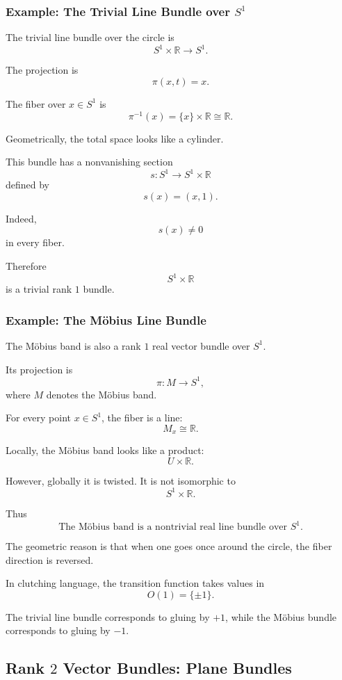 \documentclass[12pt,a4paper]{article}
\theoremstyle{notespace}
\begin{document}
\subsubsection{Example: The Trivial Line Bundle over \(S^1\)}

The trivial line bundle over the circle is
\[
S^1\times \mathbb R\longrightarrow S^1.
\]

The projection is
\[
\pi(x,t)=x.
\]

The fiber over \(x\in S^1\) is
\[
\pi^{-1}(x)=\{x\}\times \mathbb R\cong \mathbb R.
\]

Geometrically, the total space looks like a cylinder.

This bundle has a nonvanishing section
\[
s:S^1\to S^1\times \mathbb R
\]
defined by
\[
s(x)=(x,1).
\]

Indeed,
\[
s(x)\neq 0
\]
in every fiber.

Therefore
\[
S^1\times \mathbb R
\]
is a trivial rank \(1\) bundle.

\subsubsection{Example: The Möbius Line Bundle}

The Möbius band is also a rank \(1\) real vector bundle over \(S^1\).

Its projection is
\[
\pi:M\to S^1,
\]
where \(M\) denotes the Möbius band.

For every point \(x\in S^1\), the fiber is a line:
\[
M_x\cong \mathbb R.
\]

Locally, the Möbius band looks like a product:
\[
U\times \mathbb R.
\]

However, globally it is twisted. It is not isomorphic to
\[
S^1\times \mathbb R.
\]

Thus
\[
\boxed{
	\text{The Möbius band is a nontrivial real line bundle over }S^1.
}
\]

The geometric reason is that when one goes once around the circle, the fiber direction is reversed.

In clutching language, the transition function takes values in
\[
O(1)=\{\pm 1\}.
\]

The trivial line bundle corresponds to gluing by \(+1\), while the Möbius bundle corresponds to gluing by \(-1\).

\subsection{Rank \(2\) Vector Bundles: Plane Bundles}
\end{document}
